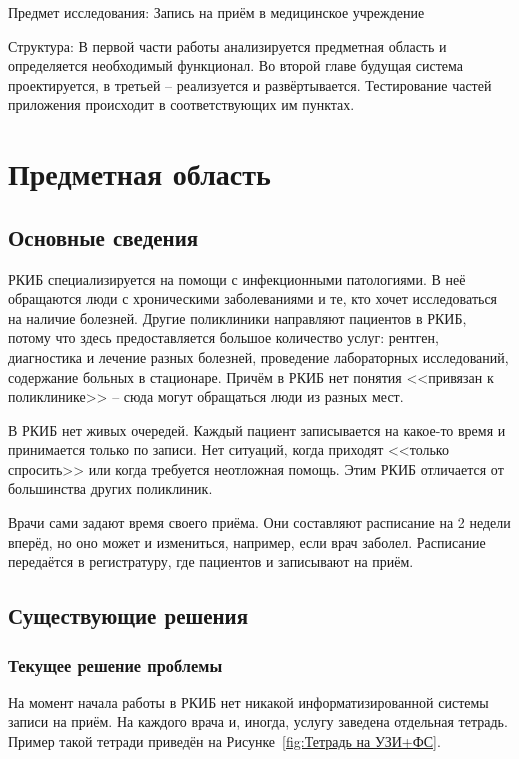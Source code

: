 \documentclass[a4paper,article]{article}
\begin{document}
\begin{sloppypar}
        Предмет исследования: Запись на приём в медицинское учреждение

        Структура: В первой части работы анализируется предметная область и определяется необходимый функционал. Во второй главе будущая система проектируется, в третьей -- реализуется и развёртывается. Тестирование частей приложения происходит в соответствующих им пунктах.

        \newpage

    \section{Предметная область}

    \subsection{Основные сведения}

        РКИБ специализируется на помощи с инфекционными патологиями. В неё обращаются люди с хроническими заболеваниями и те, кто хочет исследоваться на наличие болезней. Другие поликлиники направляют пациентов в РКИБ, потому что здесь предоставляется большое количество услуг: рентген, диагностика и лечение разных болезней, проведение лабораторных исследований, содержание больных в стационаре. Причём в РКИБ нет понятия <<привязан к поликлинике>> -- сюда могут обращаться люди из разных мест.

        В РКИБ нет живых очередей. Каждый пациент записывается на какое-то время и принимается только по записи. Нет ситуаций, когда приходят <<только спросить>> или когда требуется неотложная помощь. Этим РКИБ отличается от большинства других поликлиник.

        Врачи сами задают время своего приёма. Они составляют расписание на 2 недели вперёд, но оно может и измениться, например, если врач заболел. Расписание передаётся в регистратуру, где пациентов и записывают на приём.

    \subsection{Существующие решения}

    \subsubsection{Текущее решение проблемы}\label{Текущее решение проблемы}

        На момент начала работы в РКИБ нет никакой информатизированной системы записи на приём. На каждого врача и, иногда, услугу заведена отдельная тетрадь. Пример такой тетради приведён на Рисунке~\ref{fig:Тетрадь на УЗИ+ФС}.


\end{sloppypar}
\end{document}
